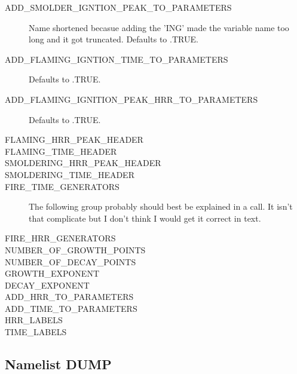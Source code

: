 \documentclass[12pt,twoside]{book}
\begin{document}
\begin{description}
  \item[ADD\_SMOLDER\_IGNTION\_PEAK\_TO\_PARAMETERS] Name shortened becasue adding the 'ING' made the variable name too long and it got truncated. Defaults to {\ct .TRUE.}
  \item[ADD\_FLAMING\_IGNTION\_TIME\_TO\_PARAMETERS] Defaults to {\ct .TRUE.}
  \item[ADD\_FLAMING\_IGNITION\_PEAK\_HRR\_TO\_PARAMETERS] Defaults to {\ct .TRUE.}
  \item[FLAMING\_HRR\_PEAK\_HEADER]
  \item[FLAMING\_TIME\_HEADER]
  \item[SMOLDERING\_HRR\_PEAK\_HEADER]
  \item[SMOLDERING\_TIME\_HEADER]
  \item[FIRE\_TIME\_GENERATORS] The following group probably should best be explained in a call. It isn't that complicate but I don't think I would get it correct in text.
  \item[FIRE\_HRR\_GENERATORS]
  \item[NUMBER\_OF\_GROWTH\_POINTS]
  \item[NUMBER\_OF\_DECAY\_POINTS]
  \item[GROWTH\_EXPONENT]
  \item[DECAY\_EXPONENT]
  \item[ADD\_HRR\_TO\_PARAMETERS]
  \item[ADD\_TIME\_TO\_PARAMETERS]
  \item[HRR\_LABELS]
  \item[TIME\_LABELS]
\end{description}

\subsection{Namelist DUMP}
\end{document}
